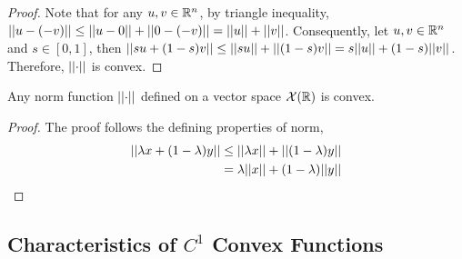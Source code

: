 \documentclass{article}
\begin{document}
    \begin{proof}
    	Note that for any $u, v \in \mathbb{R}^n$, by triangle inequality, $\vert \vert {u - (-v)} \vert \vert \leq \vert \vert {u - 0} \vert \vert + \vert \vert {0 - (-v)} \vert \vert = \vert \vert {u} \vert \vert + \vert \vert {v} \vert \vert$. Consequently, let $u, v \in \mathbb{R}^n$ and $s \in [0, 1]$, then $\vert \vert {s u + (1-s) v} \vert \vert \leq \vert \vert {su} \vert \vert + \vert \vert {(1-s) v} \vert \vert = s \vert \vert {u} \vert \vert + (1-s) \vert \vert {v} \vert \vert$. Therefore, $\vert \vert {\cdot} \vert \vert$ is convex.
    \end{proof}
    
    \begin{proposition}
    	Any norm function $\vert \vert {\cdot} \vert \vert$ defined on a vector space $\mathcal{{X}}(\mathbb{R})$ is convex.
    \end{proposition}
    
    \begin{proof}
    	The proof follows the defining properties of norm,
    	\begin{align}
    		\vert \vert {\lambda x + (1 - \lambda) y} \vert \vert &\leq \vert \vert {\lambda x} \vert \vert  + \vert \vert {(1 - \lambda) y} \vert \vert \\
    		&= \lambda \vert \vert {x} \vert \vert + (1 - \lambda) \vert \vert {y} \vert \vert
    	\end{align}
    \end{proof}
	
	\subsection{Characteristics of $C^1$ Convex Functions}
	
\end{document}
